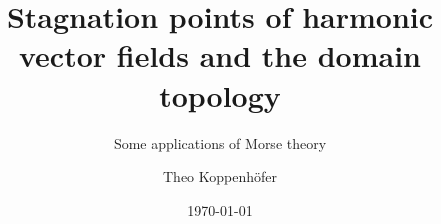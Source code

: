 





\title{Stagnation points of harmonic vector fields and the domain topology}
\subtitle{Some applications of Morse theory}
\author{Theo Koppenhöfer}
\date{\today}


\graphicspath{{../Art/}}
\graphicspath{{../Plots/}}
\graphicspath{{../Figures/}}

\tikzexternaldisable


\usepackage{transparent}





{
\frame[plain]{\titlepage}
}


